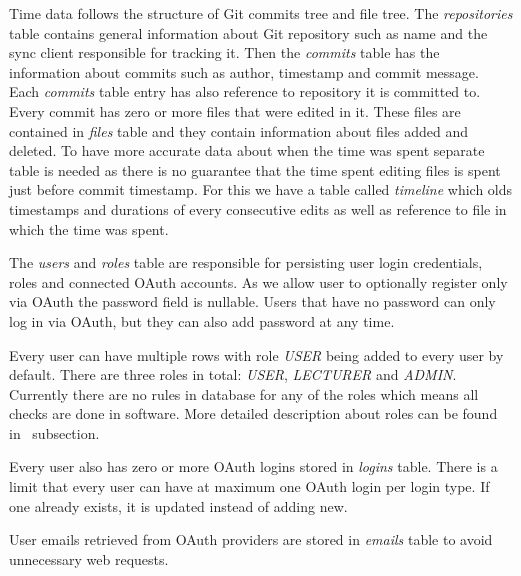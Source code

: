 Time data follows the structure of Git commits tree and file tree.
The \textit{repositories} table contains general information about Git repository such as name and the sync client
responsible for tracking it.
Then the \textit{commits} table has the information about commits such as author, timestamp and commit message.
Each \textit{commits} table entry has also reference to repository it is committed to.
Every commit has zero or more files that were edited in it.
These files are contained in \textit{files} table and they contain information about files added and deleted.
To have more accurate data about when the time was spent separate table is needed as there is no guarantee that
the time spent editing files is spent just before commit timestamp.
For this we have a table called \textit{timeline} which olds timestamps and durations of every consecutive edits as
well as reference to file in which the time was spent.

The \textit{users} and \textit{roles} table are responsible for persisting user login credentials, roles and connected OAuth accounts.
As we allow user to optionally register only via OAuth the password field is nullable.
Users that have no password can only log in via OAuth, but they can also add password at any time.

Every user can have multiple rows with role \textit{USER} being added to every user by default.
There are three roles in total: \textit{USER}, \textit{LECTURER} and \textit{ADMIN}.
Currently there are no rules in database for any of the roles which means all checks are done in software.
More detailed description about roles can be found in~ subsection.

Every user also has zero or more OAuth logins stored in \textit{logins} table.
There is a limit that every user can have at maximum one OAuth login per login type.
If one already exists, it is updated instead of adding new.

User emails retrieved from OAuth providers are stored in \textit{emails} table to avoid unnecessary web requests.

